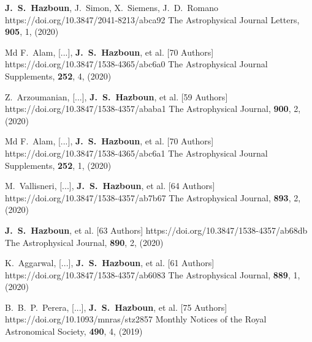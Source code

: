          {\textbf{J.~S.~Hazboun}, J.~{Simon}, X.~{Siemens}, J.~D.~{Romano}}
         {https://doi.org/10.3847/2041-8213/abca92}
         {{The Astrophysical Journal Letters}, \textbf{905}, 1, (2020)}

         {Md F.~{Alam}, [...], \textbf{J.~S.~{Hazboun}}, et al. [70 Authors]}
         {https://doi.org/10.3847/1538-4365/abc6a0}
         {{The Astrophysical Journal Supplements}, \textbf{252}, 4, (2020)}

         {Z.~{Arzoumanian}, [...], \textbf{J.~S.~{Hazboun}}, et al. [59 Authors]}
         {https://doi.org/10.3847/1538-4357/ababa1}
         {{The Astrophysical Journal}, \textbf{900}, 2, (2020)}

         {Md F.~{Alam}, [...], \textbf{J.~S.~{Hazboun}}, et al. [70 Authors]}
         {https://doi.org/10.3847/1538-4365/abc6a1}
         {{The Astrophysical Journal Supplements}, \textbf{252}, 1, (2020)}

         {M.~{Vallisneri}, [...], \textbf{J.~S.~{Hazboun}}, et al. [64 Authors]}
         {https://doi.org/10.3847/1538-4357/ab7b67}
         {{The Astrophysical Journal}, \textbf{893}, 2, (2020)}

         {\textbf{J.~S.~{Hazboun}}, et al. [63 Authors]}
         {https://doi.org/10.3847/1538-4357/ab68db}
         {{The Astrophysical Journal}, \textbf{890}, 2, (2020)}

         {K.~{Aggarwal}, [...], \textbf{J.~S.~{Hazboun}}, et al. [61 Authors]}
         {https://doi.org/10.3847/1538-4357/ab6083}
         {{The Astrophysical Journal}, \textbf{889}, 1, (2020)}

         {B.~B.~P.~{Perera}, [...], \textbf{J.~S.~{Hazboun}}, et al. [75 Authors]}
         {https://doi.org/10.1093/mnras/stz2857}
         {{Monthly Notices of the Royal Astronomical Society}, \textbf{490}, 4, (2019)}

